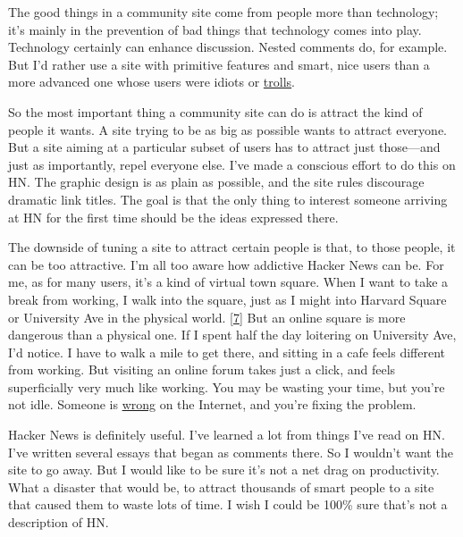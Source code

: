 The
                  good things in a community site come from people more than
                  technology; it's mainly in the prevention of bad things that
                  technology comes into play. Technology certainly can enhance
                  discussion. Nested comments do, for example. But I'd rather
                  use a site with primitive features and smart, nice users than
                  a more advanced one whose users were idiots or
                  \href{http://www.paulgraham.com/trolls.html}{trolls}.

So the most
                  important thing a community site can do is attract the kind of
                  people it wants. A site trying to be as big as possible wants
                  to attract everyone. But a site aiming at a particular subset
                  of users has to attract just those---and just as
                  importantly, repel everyone else. I've made a conscious effort
                  to do this on HN. The graphic design is as plain as possible,
                  and the site rules discourage dramatic link titles. The goal
                  is that the only thing to interest someone arriving at HN for
                  the first time should be the ideas expressed there.

The
                  downside of tuning a site to attract certain people is that,
                  to those people, it can be too attractive. I'm all too aware
                  how addictive Hacker News can be. For me, as for many users,
                  it's a kind of virtual town square. When I want to take a
                  break from working, I walk into the square, just as I might
                  into Harvard Square or University Ave in the physical world.
                  [\href{\#f7n}{7}]
                  But an online square is more dangerous than a physical one. If
                  I spent half the day loitering on University Ave, I'd notice.
                  I have to walk a mile to get there, and sitting in a cafe
                  feels different from working. But visiting an online forum
                  takes just a click, and feels superficially very much like
                  working. You may be wasting your time, but you're not idle.
                  Someone is \href{http://xkcd.com/386/}{wrong} on the
                  Internet, and you're fixing the problem.

Hacker
                  News is definitely useful. I've learned a lot from things I've
                  read on HN. I've written several essays that began as comments
                  there. So I wouldn't want the site to go away. But I would
                  like to be sure it's not a net drag on productivity. What a
                  disaster that would be, to attract thousands of smart people
                  to a site that caused them to waste lots of time. I wish I
                  could be 100\% sure that's not a description of HN.

